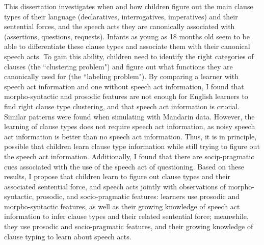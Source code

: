 This dissertation investigates when and how children figure out the main clause types of their language (declaratives, interrogatives, imperatives) and their sentential forces, and the speech acts they are canonically associated with (assertions, questions, requests). Infants as young as 18 months old seem to be able to differentiate these clause types and associate them with their canonical speech acts. To gain this ability, children need to identify the right categories of clauses (the ``clustering problem") and figure out what functions they are canonically used for (the ``labeling problem"). By comparing a learner with speech act information and one without speech act information, I found that morpho-syntactic and prosodic features are not enough for English learners to find right clause type clustering, and that speech act information is crucial. Similar patterns were found when simulating with Mandarin data. However, the learning of clause types does not require  speech act information, as noisy speech act information is better than no speech act information. Thus, it is in principle, possible that children learn clause type information while still trying to figure out the speech act information. Additionally, I found that there are socip-pragmatic cues associated with the use of the speech act of questioning. Based on these results, I propose that children learn to figure out clause types and their associated sentential force, and speech acts jointly with observations of morpho-syntactic, prosodic, and socio-pragmatic features: learners use prosodic and morpho-syntactic features, as well as their growing knowledge of speech act information to infer clause types and their related sentential force; meanwhile, they use prosodic and socio-pragmatic features, and their growing knowledge of clause typing to learn about speech acts.  




